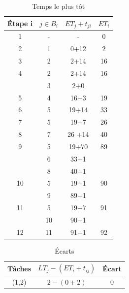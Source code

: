 \documentclass{article}
\begin{document}
\begin{center}
\begin{table}[]
    \caption{Temps le plus tôt} \label{tab:Temps le plus tard}
    \begin{center}
        \begin{tabular}{|c|c|c|c|}
            \hline
            Étape i & $j \in B_i$ & $ET_j+t_{ji}$ & $ET_i$ \\
            \hline
            1        & -           & -             & 0      \\
            2        & 1          & 0+12          & 2      \\
            3        & 2          & 2+14          & 16     \\
            4        & 2          & 2+14          & 16     \\
                     & 3          & 2+0           &        \\
            5        & 4           & 16+3          & 19     \\
            6        & 5           & 19+14         & 33     \\
            7        & 5           & 19+7          & 26     \\
            8        & 7           & 26 +14        & 40     \\
            9        & 5           & 19+70         & 89     \\
                     & 6          & 33+1          &        \\
                     & 8          & 40+1          &        \\
            10       & 5           & 19+1          & 90     \\
                     & 9           & 89+1          &        \\
            11       & 5           & 19+7          & 91     \\
                     & 10           & 90+1          &        \\
            12       & 11           & 91+1          & 92     \\
            \hline
                                                     
                        
                                        
        \end{tabular}
    \end{center}
\end{table}

\begin{table}[]
    \caption{Écarts} \label{tab:Temps le plus tard}
    \begin{center}
        \begin{tabular}{|c|c|c|}
           \hline
           Tâches & $LT_j-(ET_i+t_{ij})$ & Écart \\
           \hline 
           (1,2) & $2-(0+2)$ & 0 \\


\end{tabular}
\end{center}
\end{table}
\end{center}
\end{document}
